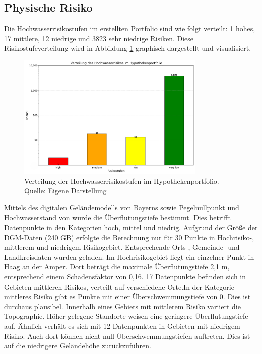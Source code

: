 \subsection{Physische Risiko}
Die Hochwasserrisikostufen im erstellten Portfolio sind wie folgt verteilt: 1 hohes, 17 mittlere, 12 niedrige und 3823 sehr niedrige Risiken. Diese Risikostufeverteilung wird in Abbildung \ref{fig:riskostufe} graphisch dargestellt und visualisiert.
\begin{figure}[htbp]
    \centering
    \includegraphics[width=0.8\textwidth]{figures/hochwasserrisiko_verteilung.png}
    \caption{Verteilung der Hochwasserrisikostufen im Hypothekenportfolio. Quelle: Eigene Darstellung}
    \label{fig:riskostufe}
\end{figure}
\FloatBarrier
Mittels des digitalen Geländemodells von Bayerns sowie Pegelnullpunkt und Hochwasserstand von \textcite{bayern2016hochwassernachrichtendienst} wurde die Überflutungstiefe bestimmt. Dies betrifft Datenpunkte in den Kategorien hoch, mittel und niedrig.
Aufgrund der Größe der \ac{DGM}-Daten (240 GB) erfolgte die Berechnung nur für 30 Punkte in Hochrisiko-, mittlerem und niedrigem Risikogebiet. Entsprechende Orts-, Gemeinde- und Landkreisdaten wurden geladen.
Im Hochrisikogebiet liegt ein einzelner Punkt in Haag an der Amper. Dort beträgt die maximale Überflutungstiefe 2,1 m, entsprechend einem Schadensfaktor von 0,16.
17 Datenpunkte befinden sich in Gebieten mittleren Risikos, verteilt auf verschiedene Orte.In der Kategorie mittleres Risiko gibt es Punkte mit einer Überschwemmungstiefe von 0. Dies ist durchaus plausibel. Innerhalb eines Gebiets mit mittlerem Risiko variiert die Topographie. Höher gelegene Standorte weisen eine geringere Überflutungstiefe auf. Ähnlich verhält es sich mit 12 Datenpunkten in Gebieten mit niedrigem Risiko. Auch dort können nicht-null Überschwemmungstiefen auftreten. Dies ist auf die niedrigere Geländehöhe zurückzuführen. 

